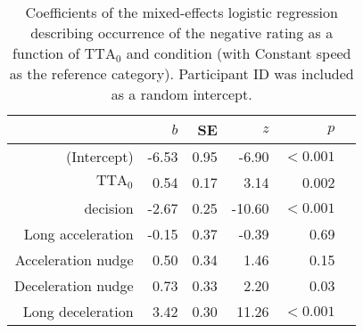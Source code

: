 \begin{table}[h]
\centering
\caption{Coefficients of the mixed-effects logistic regression describing occurrence of the negative rating as a function of $\textrm{TTA}_0$ and condition (with Constant speed as the reference category). Participant ID was included as a random intercept.}
\label{tab:rating}
\begin{tabular}{rrrrrr}
\toprule
 & $b$ & SE & $z$ & $p$ \\
\midrule
(Intercept) & -6.53 & 0.95 & -6.90 & $<0.001$ \\
$\textrm{TTA}_0$ & 0.54 & 0.17 & 3.14 & 0.002 \\
decision & -2.67 & 0.25 & -10.60 & $<0.001$ \\
Long acceleration & -0.15 & 0.37 & -0.39 & 0.69 \\
Acceleration nudge & 0.50 & 0.34 & 1.46 & 0.15 \\
Deceleration nudge & 0.73 & 0.33 & 2.20 & 0.03 \\
Long deceleration & 3.42 & 0.30 & 11.26 & $<0.001$ \\
\bottomrule
\end{tabular}
\end{table}
